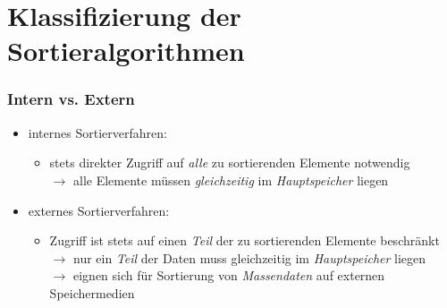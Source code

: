 \documentclass{lehramt-informatik}
\begin{document}

\chapter{Klassifizierung der Sortieralgorithmen}

%

\subsection{Intern vs. Extern}

\cite[Seite 34]{aud:fs:tafeluebung-11}

\begin{itemize}

%

\item internes Sortierverfahren:

\begin{itemize}
\item stets direkter Zugriff auf \emph{alle} zu sortierenden Elemente
notwendig\\
%
$\rightarrow$ alle Elemente müssen \emph{gleichzeitig} im
\emph{Hauptspeicher} liegen
\end{itemize}

%

\item externes Sortierverfahren:

\begin{itemize}
\item Zugriff ist stets auf einen \emph{Teil} der zu sortierenden
Elemente beschränkt\\
%
$\rightarrow$ nur ein \emph{Teil} der Daten muss gleichzeitig im
\emph{Hauptspeicher} liegen\\
%
$\rightarrow$ eignen sich für Sortierung von \emph{Massendaten} auf
externen Speichermedien
\end{itemize}

\end{itemize}

%
\end{document}
